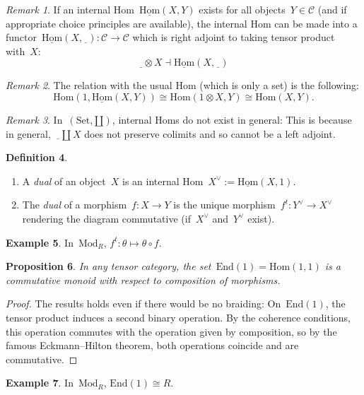 \documentclass[a4paper,english,12pt]{scrartcl}
\theoremstyle{definition}
\newtheorem{defn}{Definition}[section]
\newtheorem{ex}[defn]{Example}
\theoremstyle{plain}
\newtheorem{prop}[defn]{Proposition}
\theoremstyle{remark}
\newtheorem{rem}[defn]{Remark}
\newcommand{\C}{\mathcal{C}}
\renewcommand{\_}{\mathpunct{.}\,}
\newcommand{\?}{\,{:}\,}
\newcommand{\Mod}{\mathrm{Mod}}
\newcommand{\Set}{\mathrm{Set}}
\newcommand{\Hom}{\underline{\mathrm{Hom}}}
\renewcommand{\hom}{\mathrm{Hom}}
\newcommand{\End}{\mathrm{End}}
\newcommand{\freist}{\underline{\ \ }}
\begin{document}
\begin{rem}If an internal Hom~$\Hom(X,Y)$ exists for all objects~$Y \in \C$
(and if appropriate choice principles are available), the internal Hom can be
made into a functor~$\Hom(X,\freist) : \C \to \C$ which is right adjoint to
taking tensor product with~$X$:
\[ \freist \otimes X \dashv \Hom(X,\freist) \]
\end{rem}

\begin{rem}The relation with the usual Hom (which is only a set) is the
following:
\[ \hom(1, \Hom(X,Y)) \cong \hom(1 \otimes X, Y) \cong \hom(X,Y). \]
\end{rem}

\begin{rem}In~$(\Set,\amalg)$, internal Homs do not exist in general: This is
because in general,~$\freist \amalg X$ does not preserve colimits and so cannot
be a left adjoint.\end{rem}

\begin{defn}\begin{enumerate}\item A \emph{dual} of an object~$X$ is an internal
Hom~$X^\vee := \Hom(X,1)$. \item The \emph{dual} of a morphism~$f : X \to Y$ is
the unique morphism~$f^t : Y^\vee \to X^\vee$ rendering the diagram
commutative (if~$X^\vee$ and~$Y^\vee$ exist).\end{enumerate}\end{defn}

\begin{ex}In~$\Mod_R$, $f^t : \theta \mapsto \theta \circ f$.\end{ex}

\begin{prop}In any tensor category, the set~$\End(1) = \hom(1,1)$ is a
commutative monoid with respect to composition of morphisms.\end{prop}
\begin{proof}The results holds even if there would be no braiding:
On~$\End(1)$, the tensor product induces a second binary operation. By the
coherence conditions, this operation commutes with the operation given by
composition, so by the famous Eckmann--Hilton theorem, both operations coincide
and are commutative.\end{proof}

\begin{ex}In~$\Mod_R$, $\End(1) \cong R$.\end{ex}
\end{document}
